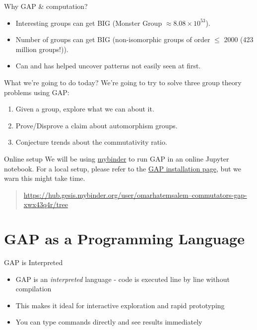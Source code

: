 \documentclass{beamer}
\begin{document}
\begin{frame}{Why GAP \& computation?}
\begin{itemize}
    \item<1-> Interesting groups can get BIG (Monster Group $\approx 8.08 \times 10^{53}$).
    \item<2-> Number of groups can get BIG (non-isomorphic groups of order $\leq$ 2000 (423 million groups!)).
    \item<3-> Can and has helped uncover patterns not easily seen at first.
\end{itemize}
\end{frame}


\begin{frame}{What we're going to do today?}
We're going to try to solve three group theory problems using GAP:
\begin{enumerate}
    \item<1-> Given a group, explore what we can about it.
    \item<2-> Prove/Disprove a claim about automorphism groups.
    \item<3-> Conjecture trends about the commutativity ratio.
\end{enumerate}
\end{frame}


\begin{frame}{Online setup}
    We will be using \href{https://hub.gesis.mybinder.org/user/omarhatemsalem--commutators-gap-xwx43q4r/tree}{mybinder} to run GAP in an online Jupyter notebook.   
    For a local setup, please refer to the \href{https://www.gap-system.org/Releases/}{GAP installation page}, but we warn this might take time. 

    \begin{quote}
        \href{https://hub.gesis.mybinder.org/user/omarhatemsalem--commutators-gap-xwx43q4r/tree}{https://hub.gesis.mybinder.org/user/omarhatemsalem--commutators-gap-xwx43q4r/tree}
    \end{quote}
\end{frame}


\section{GAP as a Programming Language}
\begin{frame}[fragile]{GAP is Interpreted}
    \begin{itemize}
        \item<1-> GAP is an \textit{interpreted} language - code is executed line by line without compilation
        \item<2-> This makes it ideal for interactive exploration and rapid prototyping
        \item<3-> You can type commands directly and see results immediately
    \end{itemize}
\end{frame}
\end{document}
